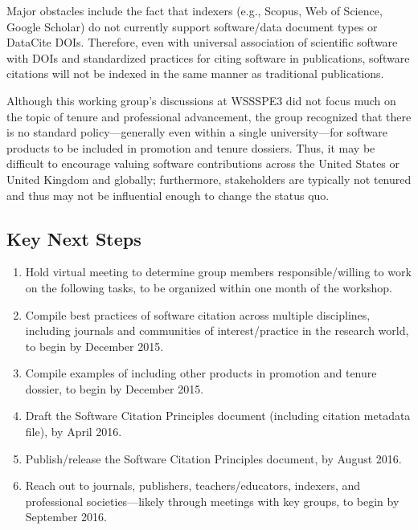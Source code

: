 Major obstacles include the fact that indexers (e.g., Scopus, Web of Science,
Google Scholar) do not currently support software/data document types or
DataCite DOIs. Therefore, even with universal association of scientific software
with DOIs and standardized practices for citing software in publications,
software citations will not be indexed in the same manner as traditional
publications.

Although this working group's discussions at WSSSPE3 did not focus much on the
topic of tenure and professional advancement, 
the group recognized that there is no standard
policy---generally even within a single university---for software products to be
included in promotion and tenure dossiers. Thus, it may be difficult to
encourage valuing software contributions across the United States or United
Kingdom and globally; furthermore, stakeholders are typically not tenured and
thus may not be influential enough to change the status quo.

\subsection{Key Next Steps}
\label{SC:next-steps}

\begin{enumerate}

\item Hold virtual meeting to determine group members responsible\slash willing
to work on the following tasks, to be organized within one month of the workshop.

\item Compile best practices of software citation across multiple disciplines,
including journals and communities of interest\slash practice in the research
world, to begin by December 2015.

\item Compile examples of including other products in promotion and tenure
dossier, to begin by December 2015.

\item Draft the Software Citation Principles document (including citation
metadata file), by April 2016.

\item Publish\slash release the Software Citation Principles document, by August
2016.

\item Reach out to journals, publishers, teachers\slash educators, indexers, and
professional societies---likely through meetings with key groups, to begin by
September 2016.

\end{enumerate}

